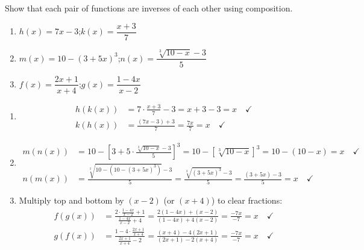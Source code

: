 \documentclass{ximera}
\begin{document}
\begin{problem}
Show that each pair of functions are inverses of each other using composition.
\begin{enumerate}
  \item[(a)] $h(x) = 7x-3$;\quad $k(x) = \dfrac{x+3}{7}$
  \medskip
  \item[(b)] $m(x) = 10-(3+5x)^3$;\quad $n(x) = \dfrac{\sqrt[3]{10-x}-3}{5}$
  \medskip
  \item[(c)] $f(x) = \dfrac{2x+1}{x+4}$;\quad $g(x) = \dfrac{1-4x}{x-2}$
\end{enumerate}

\begin{solution}
\begin{enumerate}
  \item[(a)]
  \begin{align*}
    h(k(x)) &= 7\!\cdot\!\frac{x+3}{7}-3 = x+3-3 = x \quad\checkmark\\
    k(h(x)) &= \frac{(7x-3)+3}{7} = \frac{7x}{7} = x \quad\checkmark
  \end{align*}

  \item[(b)]
  \begin{align*}
    m(n(x)) &= 10-\!\left[3+5\cdot\frac{\sqrt[3]{10-x}-3}{5}\right]^3 = 10-\!\left[\sqrt[3]{10-x}\right]^3 = 10-(10-x) = x \quad\checkmark\\
    n(m(x)) &= \frac{\sqrt[3]{10-(10-(3+5x)^3)}-3}{5} = \frac{\sqrt[3]{(3+5x)^3}-3}{5} = \frac{(3+5x)-3}{5} = x \quad\checkmark
  \end{align*}

  \item[(c)] Multiply top and bottom by $(x-2)$ (or $(x+4)$) to clear fractions:
  \begin{align*}
    f(g(x)) &= \frac{2\!\cdot\!\frac{1-4x}{x-2}+1}{\frac{1-4x}{x-2}+4} = \frac{2(1-4x)+(x-2)}{(1-4x)+4(x-2)} = \frac{-7x}{-7} = x \quad\checkmark\\
    g(f(x)) &= \frac{1-4\!\cdot\!\frac{2x+1}{x+4}}{\frac{2x+1}{x+4}-2} = \frac{(x+4)-4(2x+1)}{(2x+1)-2(x+4)} = \frac{-7x}{-7} = x \quad\checkmark
  \end{align*}
\end{enumerate}
\end{solution}
\end{problem}
\end{document}
